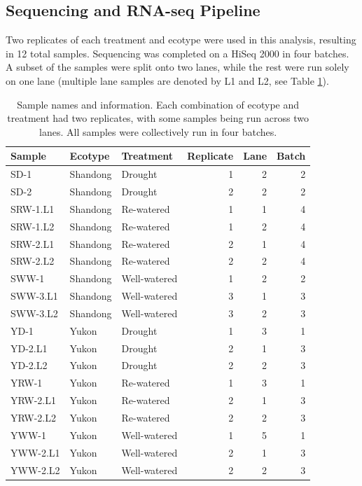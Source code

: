 \documentclass[12pt]{article}
\begin{document}
	\subsection{Sequencing and RNA-seq Pipeline}
	Two replicates of each treatment and ecotype were used in this analysis, resulting in 12 total samples. Sequencing was completed on a HiSeq 2000 in four batches. A subset of the samples were split onto two lanes, while the rest were run solely on one lane (multiple lane samples are denoted by L1 and L2, see Table \ref{table:samples}). 
	
	\begin{table}[H]
		\centering
		\begin{tabular}{lllrrr}
			\toprule
			Sample & Ecotype & Treatment & Replicate & Lane & Batch\\
			\midrule
			\rowcolor{Gray}
			SD-1 & Shandong & Drought & 1 & 2 & 2\\
			SD-2 & Shandong & Drought & 2 & 2 & 2\\
			\rowcolor{Gray}
			SRW-1.L1 & Shandong & Re-watered & 1 & 1 & 4\\
			\rowcolor{Gray}
			SRW-1.L2 & Shandong & Re-watered & 1 & 2 & 4\\
			SRW-2.L1 & Shandong & Re-watered & 2 & 1 & 4\\
			SRW-2.L2 & Shandong & Re-watered & 2 & 2 & 4\\
			\rowcolor{Gray}
			SWW-1 & Shandong & Well-watered & 1 & 2 & 2\\
			SWW-3.L1 & Shandong & Well-watered & 3 & 1 & 3\\
			SWW-3.L2 & Shandong & Well-watered & 3 & 2 & 3\\
			\rowcolor{Gray}
			YD-1 & Yukon & Drought & 1 & 3 & 1\\
			YD-2.L1 & Yukon & Drought & 2 & 1 & 3\\
			YD-2.L2 & Yukon & Drought & 2 & 2 & 3\\
			\rowcolor{Gray}
			YRW-1 & Yukon & Re-watered & 1 & 3 & 1\\
			YRW-2.L1 & Yukon & Re-watered & 2 & 1 & 3\\
			YRW-2.L2 & Yukon & Re-watered & 2 & 2 & 3\\
			\rowcolor{Gray}
			YWW-1 & Yukon & Well-watered & 1 & 5 & 1\\		
			YWW-2.L1 & Yukon & Well-watered & 2 & 1 & 3\\
			YWW-2.L2 & Yukon & Well-watered & 2 & 2 & 3\\
			\bottomrule
		\end{tabular}
		\caption[Sample Names and Information]{Sample names and information. Each combination of ecotype and treatment had two replicates, with some samples being run across two lanes. All samples were collectively run in four batches.}
		\label{table:samples}
	\end{table}
\end{document}
